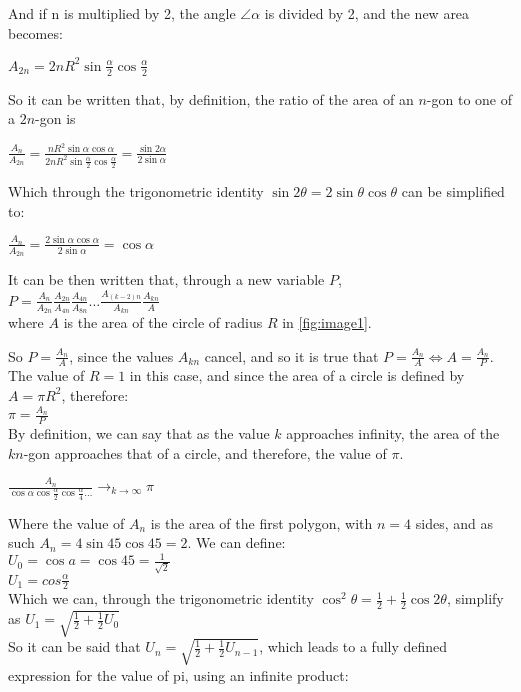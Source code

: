 And if n is multiplied by 2, the angle $\angle \alpha$ is divided by 2, 
and the new area becomes: 

$A_{2n} = 2n R^2 \sin{\frac{\alpha}{2}} \cos{\frac{\alpha}{2}}$

So it can be written that, by definition, the ratio of 
the area of an $n$-gon to one of a $2n$-gon is

$\frac{A_{n}}{A_{2n}} = \frac{n R^2 \sin{\alpha} \cos{\alpha}}{2 n R^2 \sin{\frac{\alpha}{2}} \cos{\frac{\alpha}{2}}} = \frac{\sin{2 \alpha}}{2 \sin{\alpha}}$

Which through the trigonometric identity $\sin{2 \theta} = 2\sin{\theta} \cos{\theta}$ can 
be simplified to:

$\frac{A_{n}}{A_{2n}} = \frac{2\sin{\alpha} \cos{\alpha} }{2\sin{\alpha}}  = \cos{\alpha}$

It can be then written that, through a new variable $P$, \\
$P = \frac{A_{n}}{A_{2n}} \frac{A_{2n}}{A_{4n}} \frac{A_{4n}}{A_{8n}} \dots \frac{A_{(k-2)n}}{A_{kn}} \frac{A_{kn}}{A}$ \\
where $A$ is the area of the circle of radius $R$ 
in \ref{fig:image1}. 

So $P = \frac{A_{n}}{A}$, since the values $A_{kn}$ cancel, and 
so it is true that $P = \frac{A_{n}}{A} \Leftrightarrow A = \frac{A_{n}}{P}$. The 
value of $R = 1$ in this case, and since the area of a circle is defined 
by $A = \pi R^2$, therefore: \\
$\pi = \frac{A_{n}}{P}$ \\
By definition, we can say that as the value $k$ approaches infinity, the area of the $kn$-gon 
approaches that of a circle, and therefore, the value of $\pi$.

$\frac{A_{n}}{\cos{\alpha} \cos{\frac{\alpha}{2}} \cos{\frac{\alpha}{4}} \dots}
\to_{k \to \infty} \pi$

Where the value of $A_{n}$ is the area of the first polygon, with $n=4$ sides, and as such 
$A_{n} = 4 \sin{45} \cos{45} = 2$. We can define: \\
$U_{0} = \cos{a} = \cos{45} = \frac{1}{\sqrt{2}}$ \\
$U_{1} = cos{\frac{\alpha}{2}}$ \\
Which we can, through the trigonometric identity 
$\cos^2{\theta} = \frac{1}{2} + \frac{1}{2} \cos{2\theta}$, simplify as
$U_{1} = \sqrt{\frac{1}{2} + \frac{1}{2} U_{0}}$ \\
So it can be said that $U_{n} = \sqrt{\frac{1}{2} + \frac{1}{2} U_{n - 1}}$, which leads to 
a fully defined expression for the value of pi, using an infinite product: 

